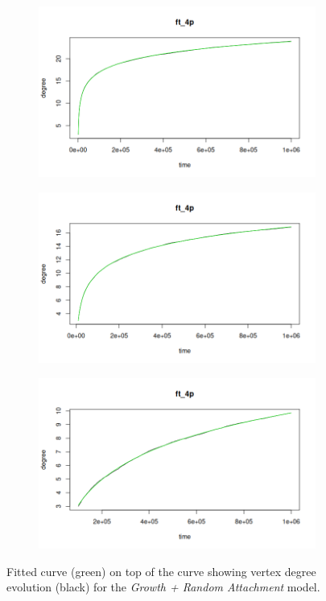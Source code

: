 \begin{figure}[ht]
\begin{subfigure}{.5\textwidth}
\end{subfigure}%
\begin{subfigure}{.5\textwidth}
  \centering
  \includegraphics[width=\linewidth]{figures/scaling_fits/fit_ra_3.png}
\end{subfigure}
\begin{subfigure}{.5\textwidth}
  \centering
  \includegraphics[width=\linewidth]{figures/scaling_fits/fit_ra_4.png}
\end{subfigure}%
\begin{subfigure}{.5\textwidth}
  \centering
  \includegraphics[width=\linewidth]{figures/scaling_fits/fit_ra_5.png}
\end{subfigure}
\caption{Fitted curve (green) on top of the curve showing vertex degree evolution (black) for the \textit{Growth + Random Attachment} model.}
\label{fig:fit_RA}
\end{figure}


